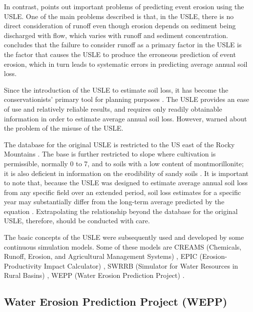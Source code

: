 In contrast, \citet{kinnell2005-851} points out important problems of predicting
event erosion using the USLE. One of the main problems described is that, in the
USLE, there is no direct consideration of runoff even though erosion depends on
sediment being discharged with flow, which varies with runoff and sediment
concentration. \citet{kinnell2005-851} concludes that the failure to consider
runoff as a primary factor in the USLE is the factor that causes the USLE to
produce the erroneous prediction of event erosion, which in turn leads to
systematic errors in predicting average annual soil loss.

Since the introduction of the USLE to estimate soil loss, it has become the
conservationists' primary tool for planning purposes
\citep{diaz1987-189,centeri2002-211}. The USLE provides an ease of use and
relatively reliable results, and requires only readily obtainable information in
order to estimate average annual soil loss. However,
\citet{wischmeier1976-misuse} warned about the problem of the misuse of the
USLE.

The database for the original USLE is restricted to the US east of the Rocky
Mountains \citep{wischmeier1978-537}. The base is further restricted to slope
where cultivation is permissible, normally 0 to 7\textdegree, and to soils with
a low content of montmorillonite; it is also deficient in information on the
erodibility of sandy soils \citep{wischmeier1978-537}. It is important to note
that, because the USLE was designed to estimate average annual soil loss from
any specific field over an extended period, soil loss estimates for a specific
year may substantially differ from the long-term average predicted by the
equation \citep{wischmeier1976-misuse}. Extrapolating the relationship beyond
the database for the original USLE, therefore, should be conducted with care.

The basic concepts of the USLE were subsequently used and developed by some
continuous simulation models. Some of these models are CREAMS (Chemicals,
Runoff, Erosion, and Agricultural Management Systems) \citep{knisel1980-creams},
EPIC (Erosion-Productivity Impact Calculator) \citep{williams1984-129}, SWRRB
(Simulator for Water Resources in Rural Basins) \citep{williams1985-970}, WEPP
(Water Erosion Prediction Project) \citep{nearing1989-1587, flanagan1995-usda}.

\subsection{Water Erosion Prediction Project (WEPP)}
\label{sec:WaterErosionPredictionProjectWEPP}

